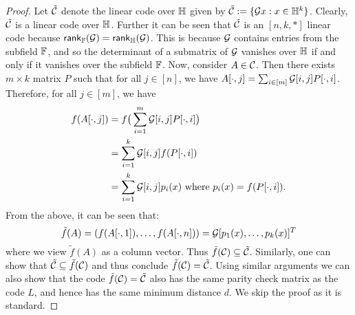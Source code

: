 \begin{proof}
Let $\tilde{\mathcal{C}}$ denote the linear code over $\mathbb{H}$ given by $\tilde{\mathcal{C}} :=
\{\mathcal{G}x: x\in \mathbb{H}^k\}$. Clearly, $\tilde{\mathcal{C}}$ is a linear code over $\mathbb{H}$.
Further it can be seen that $\tilde{\mathcal{C}}$ is an $[n,k,\ast]$ linear code because
$\mathsf{rank}_{\mathbb{F}}(\mathcal{G})=\mathsf{rank}_{\mathbb{H}}(\mathcal{G})$. This is because $\mathcal{G}$
contains entries from the subfield $\mathbb{F}$, and so the determinant of a submatrix of $\mathcal{G}$
vanishes over $\mathbb{H}$ if and only if it vanishes over the subfield $\mathbb{F}$. Now,
consider $A\in \mathcal{C}$. Then there exists $m\times k$ matrix $P$ such that for all $j\in [n]$, 
we have $A[\cdot,j]=\sum_{i\in [m]}\mathcal{G}[i,j]P[\cdot,i]$. Therefore, for all
$j\in [m]$,  we have
\begin{align*}
f(A[\cdot,j]) &= f\big(\sum_{i=1}^m \mathcal{G}[i,j]P[\cdot,i]\big) \\
	&= \sum_{i=1}^k \mathcal{G}[i,j]f(P[\cdot,i]) \\
	&= \sum_{i=1}^k \mathcal{G}[i,j]p_i(x) \text{ where } p_i(x)=f(P[\cdot,i]).
\end{align*}
From the above, it can be seen that:
\[ \tilde{f}(A)=(f(A[\cdot,1]),\ldots,f(A[\cdot,n]))=\mathcal{G}
[p_1(x),\ldots,p_k(x)]^T \]
 where we view $\tilde{f}(A)$ as a column vector. Thus
$\tilde{f}(\mathcal{C})\subseteq \tilde{\mathcal{C}}$. Similarly, one can show that
$\tilde{\mathcal{C}}\subseteq \tilde{f}(\mathcal{C})$ and thus conclude
$\tilde{f}(\mathcal{C})=\tilde{\mathcal{C}}$. Using similar arguments we can also show
that the code $\tilde{f}(\mathcal{C})=\tilde{\mathcal{C}}$ also has the same parity check
matrix as the code $L$, and hence has the same minimum distance $d$. We skip the
proof as it is standard. 
\end{proof}

